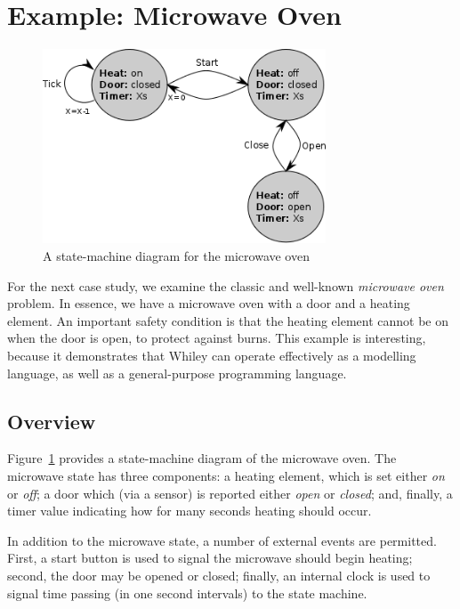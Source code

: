\newpage
\section{Example: Microwave Oven}
\label{microwave}
\begin{figure}[!t]
\centering
\includegraphics[width=0.75\textwidth]{../images/microwave.png}
\caption{A state-machine diagram for the microwave oven}
\label{fig_microwave}
\end{figure}

For the next case study, we examine the classic and well-known {\em microwave oven} problem.  In essence, we have a microwave oven with a door and a heating element.  An important safety condition is that the heating element cannot be on when the door is open, to protect against burns.  This example is interesting, because it demonstrates that Whiley can operate effectively as a modelling language, as well as a general-purpose programming language.

\subsection{Overview}
Figure~\ref{fig_microwave} provides a state-machine diagram of the microwave oven.  The microwave state has three components: a heating element, which is set either {\em on} or {\em off}; a door which (via a sensor) is reported either {\em open} or {\em closed}; and, finally, a timer value indicating how for many seconds heating should occur.

In addition to the microwave state, a number of external events are permitted.  First, a start button is used to signal the microwave should begin heating; second, the door may be opened or closed; finally, an internal clock is used to signal time passing (in one second intervals) to the state machine.


